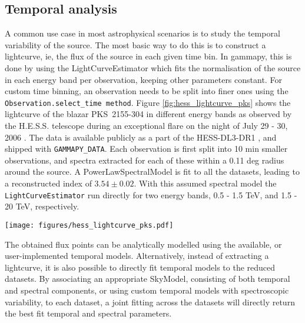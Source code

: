 \subsection{Temporal analysis}
\label{ssec:temporal-analysis}

A common use case in most astrophysical scenarios is to study the temporal
variability of the source. The most basic way to do this is to construct a
lightcurve, ie, the flux of the source in each given time bin. In gammapy, this
is done by using the LightCurveEstimator which fits the normalisation of the
source in each energy band per observation, keeping other parameters constant.
For custom time binning, an observation needs to be split into finer ones using
the \verb"Observation.select_time method". Figure \ref{fig:hess_lightcurve_pks}
shows the lightcurve of the blazar PKS~2155-304 in different energy bands as
observed by the H.E.S.S. telescope during an exceptional flare on the night of
July 29 - 30, 2006 \cite{2009A&A...502..749A}. The data is available publicly
as a part of the HESS-DL3-DR1 \cite{HESS-DL3-DR1}, and shipped with
\verb"GAMMAPY_DATA". Each observation is first split into 10 min smaller
observations, and spectra extracted for each of these within a 0.11 deg radius
around the source. A PowerLawSpectralModel is fit to all the datasets, leading
to a reconstructed index of $3.54 \pm 0.02$. With this assumed spectral model
the \verb"LightCurveEstimator" run directly for two energy bands, 0.5 - 1.5
TeV, and 1.5 - 20 TeV,	respectively.

\begin{figure*}[t]
	\centering
	\texttt{[image: figures/hess\_lightcurve\_pks.pdf]}
	\caption{10 min binned lightcurve for PKS~2155-304 in two energy bands, (500
		GeV - 1.5 TeV, and 1.5 TeV to 20 TeV) as observed by the H.E.S.S. telescopes in
		2006.} \label{fig:hess_lightcurve_pks} \end{figure*}

The obtained flux points can be analytically modelled using the available, or
user-implemented temporal models. Alternatively, instead of  extracting a
lightcurve, it is also possible to directly fit temporal models to the reduced
datasets. By associating an appropriate SkyModel, consisting of both temporal
and spectral components, or using custom temporal models with spectroscopic
variability, to each dataset, a joint fitting across the datasets will directly
return the best fit temporal and spectral parameters.
